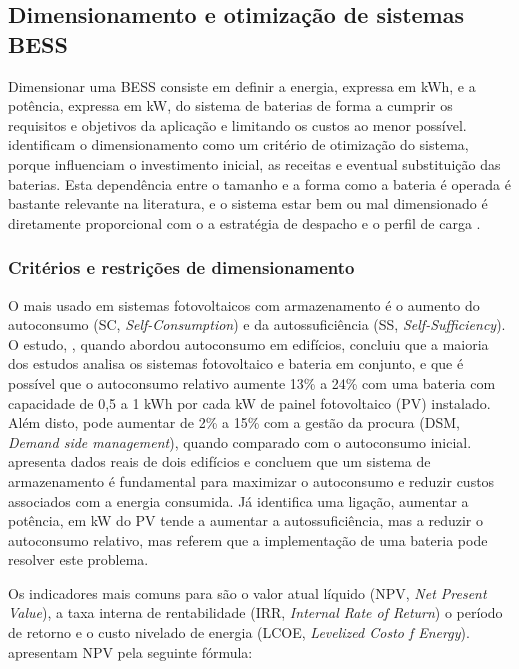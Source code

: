 \subsection{Dimensionamento e otimização de sistemas BESS}
\label{sec:Ch2.4}

 Dimensionar uma BESS consiste em definir a energia, expressa em kWh, e a potência, expressa em kW, do sistema de baterias de forma a cumprir os requisitos e objetivos da aplicação e limitando os custos ao menor possível. \textcite{ Hesse2017} identificam o dimensionamento como um critério de otimização do sistema, porque influenciam o investimento inicial, as receitas e eventual substituição das baterias. Esta dependência entre o tamanho e a forma como a bateria é operada é bastante relevante na literatura, e o sistema estar bem ou mal dimensionado é diretamente proporcional com o a estratégia de despacho e o perfil de carga \cite{ Hesse2017}.


\subsubsection{Critérios e restrições de dimensionamento}
\label{sec:Ch2.4.1}

O mais usado em sistemas fotovoltaicos com armazenamento é o aumento do autoconsumo (SC, \textit{Self-Consumption}) e da autossuficiência (SS, \textit{Self-Sufficiency}). O estudo, \cite{ Luthander2015}, quando abordou autoconsumo em edifícios, concluiu que a maioria dos estudos analisa os sistemas fotovoltaico e bateria em conjunto, e que é possível que o autoconsumo relativo aumente 13\% a 24\% com uma bateria com capacidade de 0,5 a 1 kWh por cada kW de painel fotovoltaico (PV) instalado. Além disto, pode aumentar de 2\% a 15\% com a gestão da procura (DSM, \textit{Demand side management}), quando comparado com o autoconsumo inicial. \textcite{Cillari2021} apresenta dados reais de dois edifícios e concluem que um sistema de armazenamento é fundamental para maximizar o autoconsumo e reduzir custos associados com a energia consumida. Já \cite{Weniger2014} identifica uma ligação, aumentar a potência, em kW do PV tende a aumentar a autossuficiência, mas a reduzir o autoconsumo relativo, mas referem que a implementação de uma bateria pode resolver este problema.

Os indicadores mais comuns para são o valor atual líquido (NPV, \textit{Net Present Value}), a taxa interna de rentabilidade (IRR, \textit{Internal Rate of Return}) o período de retorno e o custo nivelado de energia (LCOE, \textit{Levelized Costo f Energy}). \textcite{ Azuatalam2019} apresentam NPV pela seguinte fórmula: 


